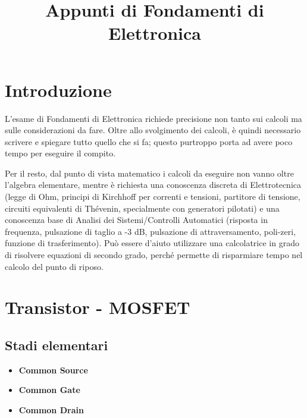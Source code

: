 \documentclass[a4paper,twocolumn,notitlepage]{book}
\begin{document}
	\onecolumn
	\title{Appunti di Fondamenti di Elettronica}
	\maketitle	
	\section*{Introduzione}
	L'esame di Fondamenti di Elettronica richiede precisione non tanto sui calcoli ma sulle considerazioni da fare.
	Oltre allo svolgimento dei calcoli, è quindi necessario scrivere e spiegare tutto quello che si fa; questo purtroppo porta ad avere poco tempo per eseguire il compito.

	Per il resto, dal punto di vista matematico i calcoli da eseguire non vanno oltre l'algebra elementare, 
	mentre è richiesta una conoscenza discreta di Elettrotecnica (legge di Ohm, principi di Kirchhoff per correnti e tensioni, partitore di tensione, circuiti equivalenti di Thévenin, specialmente con generatori pilotati) e una conoscenza base di Analisi dei Sistemi/Controlli Automatici (risposta in frequenza, pulsazione di taglio a -3 dB, pulsazione di attraversamento, poli-zeri, funzione di trasferimento). Può essere d'aiuto utilizzare una calcolatrice in grado di risolvere equazioni di secondo grado, perché permette di risparmiare tempo nel calcolo del punto di riposo.
	\newpage
	\twocolumn
	
	\section*{Transistor - MOSFET}
		\subsection*{Stadi elementari}	
			\begin{itemize}
				\item \textbf{Common Source}
				\item \textbf{Common Gate}
				\item \textbf{Common Drain}
	
			\end{itemize}
\end{document}

